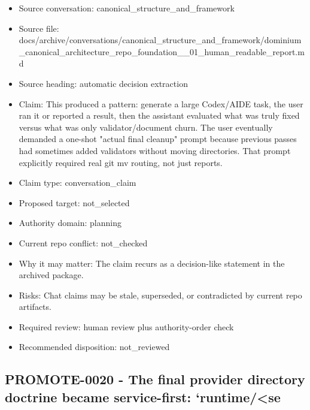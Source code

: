 \documentclass[11pt,a4paper]{report}
\begin{document}
\begin{itemize}
\item Source conversation: canonical\_structure\_and\_framework
\item Source file: docs/archive/conversations/canonical\_structure\_and\_framework/dominium\_canonical\_architecture\_repo\_foundation\_\_01\_human\_readable\_report.md
\item Source heading: automatic decision extraction
\item Claim: This produced a pattern: generate a large Codex/AIDE task, the user ran it or reported a result, then the assistant evaluated what was truly fixed versus what was only validator/document churn. The user eventually demanded a one-shot "actual final cleanup" prompt because previous passes had sometimes added validators without moving directories. That prompt explicitly required real git mv routing, not just reports.
\item Claim type: conversation\_claim
\item Proposed target: not\_selected
\item Authority domain: planning
\item Current repo conflict: not\_checked
\item Why it may matter: The claim recurs as a decision-like statement in the archived package.
\item Risks: Chat claims may be stale, superseded, or contradicted by current repo artifacts.
\item Required review: human review plus authority-order check
\item Recommended disposition: not\_reviewed
\end{itemize}

\subsection{PROMOTE-0020 - The final provider directory doctrine became service-first: `runtime/<se}
\end{document}

